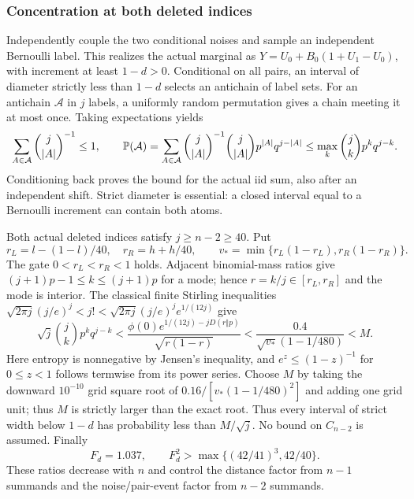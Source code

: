 \subsubsection{Concentration at both deleted indices}
\label{v9:confinement:concentration}
Independently couple the two conditional noises and sample an independent
Bernoulli label. This realizes the actual marginal as
$Y=U_0+B_0(1+U_1-U_0)$, with increment at least $1-d>0$.
Conditional on all pairs, an interval of diameter strictly less than
$1-d$ selects an antichain of label sets. For an antichain $\mathcal A$
in $j$ labels, a uniformly random permutation gives a chain meeting it
at most once. Taking expectations yields
\[
 \sum_{A\in\mathcal A}\binom j{|A|}^{-1}\le1,\qquad
 \mathbb P(\mathcal A)=\sum_{A\in\mathcal A}\binom j{|A|}^{-1}
        \binom j{|A|}p^{|A|}q^{j-|A|}
 \le\max_k\binom jk p^kq^{j-k}.
\]
Conditioning back proves the bound for the actual iid sum, also after
an independent shift. Strict diameter is essential: a closed interval
equal to a Bernoulli increment can contain both atoms.

Both actual deleted indices satisfy $j\ge n-2\ge40$. Put
\[
 r_L=l-(1-l)/40,\quad r_R=h+h/40,\qquad
 v_*=\min\{r_L(1-r_L),r_R(1-r_R)\}.
\]
The gate $0<r_L<r_R<1$ holds. Adjacent binomial-mass ratios give
$(j+1)p-1\le k\le(j+1)p$ for a mode; hence $r=k/j\in[r_L,r_R]$
and the mode is interior. The classical finite Stirling inequalities
$\sqrt{2\pi j}(j/e)^j<j!<
\sqrt{2\pi j}(j/e)^j e^{1/(12j)}$ give
\[
 \sqrt j\binom jk p^kq^{j-k}
 <\frac{\phi(0)e^{1/(12j)-jD(r\Vert p)}}{\sqrt{r(1-r)}}
 <\frac{0.4}{\sqrt{v_*}(1-1/480)}<M.
\]
Here entropy is nonnegative by Jensen's inequality, and
$e^z\le(1-z)^{-1}$ for $0\le z<1$ follows termwise from its power
series. Choose $M$ by taking the downward $10^{-10}$ grid square root of
$0.16/[v_*(1-1/480)^2]$ and adding one grid unit; thus $M$ is strictly
larger than the exact root.
Thus every interval of strict width below $1-d$ has probability less
than $M/\sqrt j$. No bound on $C_{n-2}$ is assumed. Finally
\begin{equation}\label{v9:confinement:deleted-factor}
 F_d=1.037,\qquad F_d^2>\max\{(42/41)^3,42/40\}.
\end{equation}
These ratios decrease with $n$ and control the distance factor from
$n-1$ summands and the noise/pair-event factor from $n-2$ summands.

